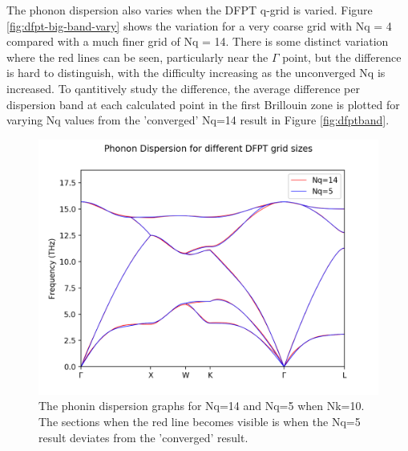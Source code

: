 \documentclass[12pt]{article}
\begin{document}
The phonon dispersion also varies when the DFPT q-grid is varied. Figure \ref{fig:dfpt-big-band-vary} shows the variation for a very coarse grid with Nq = 4 compared with a much finer grid of Nq = 14. There is some distinct variation where the red lines can be seen, particularly near the $\Gamma$ point, but the difference is hard to distinguish, with the difficulty increasing as the unconverged Nq is increased. To qantitively study the difference, the average difference per dispersion band at each calculated point in the first Brillouin zone is plotted for varying Nq values from the 'converged' Nq=14 result in Figure \ref{fig:dfptband}.

\begin{figure}[!htpb]
	\centering
	\includegraphics[width=12cm]{../Figures/disp_vary.png}
	\caption{The phonin dispersion graphs for Nq=14 and Nq=5 when Nk=10. The sections when the red line becomes visible is when the Nq=5 result deviates from the 'converged' result.}
	\label{fig:bandvary}
\end{figure}
\end{document}
